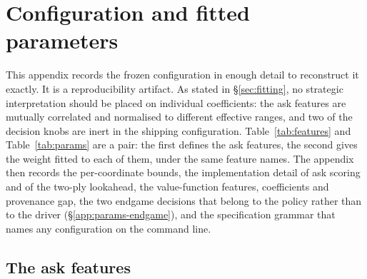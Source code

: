 \section{Configuration and fitted parameters}
\label{app:params}

This appendix records the frozen configuration in enough detail to reconstruct it
exactly. It is a reproducibility artifact. As stated in \S\ref{sec:fitting}, no
strategic interpretation should be placed on individual coefficients: the ask
features are mutually correlated and normalised to different effective ranges, and
two of the decision knobs are inert in the shipping configuration.
Table~\ref{tab:features} and Table~\ref{tab:params} are a pair: the first defines
the \numAskFeats{} ask features, the second gives the weight fitted to each of
them, under the same feature names. The appendix then records the per-coordinate
bounds, the implementation detail of ask scoring and of the two-ply lookahead,
the value-function features, coefficients and provenance gap, the two
endgame decisions that belong to the policy rather than to the driver
(\S\ref{app:params-endgame}), and the specification grammar that names any
configuration on the command line.

\subsection{The ask features}

